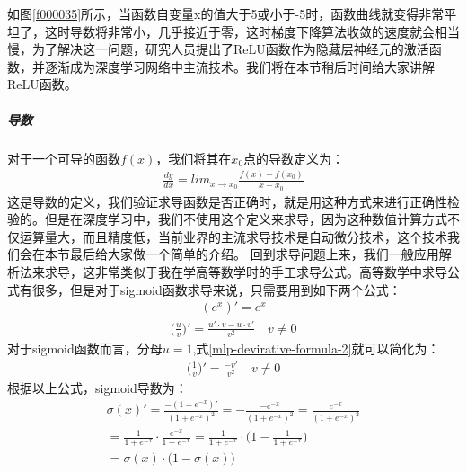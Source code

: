 \documentclass[UTF8]{article}
\begin{document}
如图\ref{f000035}所示，当函数自变量x的值大于5或小于-5时，函数曲线就变得非常平坦了，这时导数将非常小，几乎接近于零，这时梯度下降算法收敛的速度就会相当慢，为了解决这一问题，研究人员提出了ReLU函数作为隐藏层神经元的激活函数，并逐渐成为深度学习网络中主流技术。我们将在本节稍后时间给大家讲解ReLU函数。
\subparagraph{导数}
对于一个可导的函数$f(x)$，我们将其在$x_0$点的导数定义为：
\begin{equation}
\begin{aligned}
\frac{dy}{dx}=lim_{x \to x_0} \frac{f(x)-f(x_0)}{x-x_0}
\end{aligned}
\label{mlp-sigmoid-devirative-math-def}
\end{equation}
这是导数的定义，我们验证求导函数是否正确时，就是用这种方式来进行正确性检验的。但是在深度学习中，我们不使用这个定义来求导，因为这种数值计算方式不仅运算量大，而且精度低，当前业界的主流求导技术是自动微分技术，这个技术我们会在本节最后给大家做一个简单的介绍。\newline
回到求导问题上来，我们一般应用解析法来求导，这非常类似于我在学高等数学时的手工求导公式。高等数学中求导公式有很多，但是对于sigmoid函数求导来说，只需要用到如下两个公式：
\begin{equation}
\begin{aligned}
(e^x)'=e^x
\end{aligned}
\label{mlp-devirative-formula-1}
\end{equation}
\begin{equation}
\begin{aligned}
\big( \frac{u}{v} \big)' = \frac{u'\cdot v-u \cdot v'}{v^2} \quad v \ne 0
\end{aligned}
\label{mlp-devirative-formula-2}
\end{equation}
对于sigmoid函数而言，分母$u=1$,式\ref{mlp-devirative-formula-2}就可以简化为：
\begin{equation}
\begin{aligned}
\big( \frac{1}{v} \big)' = \frac{-v'}{v^2} \quad v \ne 0
\end{aligned}
\label{mlp-devirative-formula-3}
\end{equation}
根据以上公式，sigmoid导数为：
\begin{equation}
\begin{aligned}
\sigma(x)'=\frac{-(1+e^{-x})'}{(1+e^{-x})^2}=-\frac{-e^{-x}}{(1+e^{-x})^2}=\frac{e^{-x}}{(1+e^{-x})^2}\\
=\frac{1}{1+e^{-x}} \cdot \frac{e^{-x}}{1+e^{-x}}=\frac{1}{1+e^{-x}} \cdot \big( 1 - \frac{1}{1+e^{-x}} \big)\\
=\sigma(x) \cdot \big( 1- \sigma(x) \big)
\end{aligned}
\label{mlp-sigmoid-devirative-formula}
\end{equation}
\end{document}
